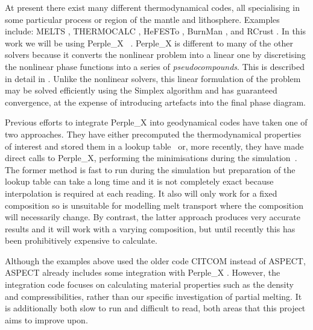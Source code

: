 At present there exist many different thermodynamical codes, all specialising in some particular \mbox{process} or region of the mantle and lithosphere.
Examples include: MELTS \parencite{ghiorsoChemicalMassTransfer1994}, 
THERMOCALC \parencite{powell_calculating_1998}, 
HeFESTo \parencite{stixrudeThermodynamicsMantleMinerals2011}, 
BurnMan \parencite{cottaarBurnManLowerMantle2014}, and
RCrust \parencite{mayneRcrustToolCalculating2016}.
In this work we will be using 
Perple\_X~
\parencite{connollyComputationPhaseEquilibria2005,connollyGeodynamicEquationState2009}.
Perple\_X is different to many of the other solvers because it converts the nonlinear problem into a linear one by discretising the nonlinear phase functions into a series of \textit{pseudocompounds}.
This is described in detail in \textcite{connollyComputationPhaseEquilibria2005}.
Unlike the nonlinear solvers, this linear formulation of the problem may be solved efficiently using the Simplex algorithm and has guaranteed convergence, at the expense of introducing artefacts into the final phase diagram. 

Previous efforts to integrate Perple\_X into geodynamical codes have taken one of two approaches.
They have either precomputed the thermodynamical properties of interest and stored them in a lookup table~\parencite[e.g.][]{magniDeepWaterRecycling2014,bouilholNumericalApproachMelting2015,freeburnNumericalModelsMagmatic2017} or, more recently, they have made direct calls to Perple\_X, performing the minimisations during the simulation~\parencite[e.g.][]{kaislaniemiLithosphereDestabilizationMelt2018}.
The former method is fast to run during the simulation but preparation of the lookup table can take a long time and it is not completely exact because interpolation is required at each reading.
It also will only work for a fixed composition so is unsuitable for modelling melt transport where the composition will necessarily change.
By contrast, the latter approach produces very accurate results and it will work with a varying composition, but until recently this has been prohibitively expensive to calculate.

Although the examples above used the older code CITCOM instead of ASPECT, ASPECT already includes some integration with Perple\_X \parencite{myhill_perplex_2018}.
However, the integration code focuses on calculating material properties such as the density and compressibilities, rather than our specific investigation of partial melting.
It is additionally both slow to run and difficult to read, both areas that this project aims to improve upon.

